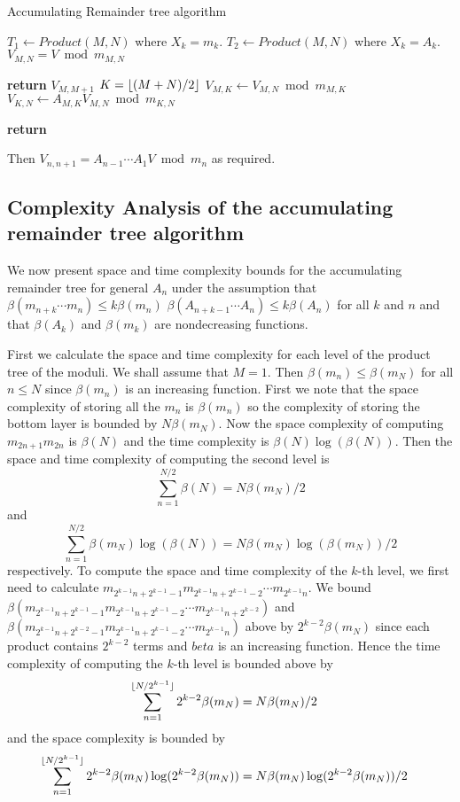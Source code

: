 \begin{algorithm}[H]
\caption{Accumulating Remainder tree algorithm}\label{accremainder}
\begin{algorithmic}

\State $T_{1}\gets Product(M,N)$ where $X_k=m_k$.
\State $T_{2}\gets Product(M,N)$ where $X_k=A_k$. 
\State $V_{M,N}=V \bmod m_{M,N}$ 
 
	\State 
	\State \textbf{return} $V_{M,M+1}$
\Else 
	\State $K=\lfloor(M+N)/2\rfloor$
	\State $V_{M,K} \gets V_{M,N}\bmod m_{M,K}$
	\State $V_{K,N} \gets A_{M,K}V_{M,N}\bmod m_{K,N}$
	
	\State \textbf{return} 

\EndIf
\EndProcedure
\end{algorithmic}
\end{algorithm}   

Then $V_{n,n+1}=A_{n-1}\cdots A_{1}V \bmod m_n$ as required. 

\subsection{Complexity Analysis of the accumulating remainder tree algorithm}

We now present space and time complexity bounds for the accumulating remainder tree for general $A_n$ under the assumption that $\beta(m_{n+k}\cdots m_{n})\leq k\beta(m_{n})$ $\beta(A_{n+k-1}\cdots A_{n})\leq k\beta(A_{n})$ for all $k$ and $n$ and that $\beta(A_k)$ and $\beta(m_k)$ are nondecreasing functions.

First we calculate the space and time complexity for each level of the product tree of the moduli.  We shall assume that $M=1$. Then $\beta(m_n)\leq \beta(m_N)$ for all $n\leq N$ since $\beta(m_n)$ is an increasing function. First we note that the space complexity of storing all the $m_n$ is $\beta(m_n)$ so the complexity of storing the bottom layer is bounded by $N\beta(m_N)$. Now the space complexity of computing $m_{2n+1} m_{2n}$ is $\beta(N)$ and the time complexity is $\beta(N)\log(\beta(N))$. Then the space and time complexity of computing the second level is \[\sum_{n=1}^{N/2} \beta(N)=N\beta(m_N)/2 \] and \[\sum_{n=1}^{N/2} \beta(m_N)\log(\beta(N))=N\beta(m_N)\log(\beta(m_N))/2 \] respectively. To compute the space and time complexity of the $k$-th level, we first need to calculate $m_{2^{k-1}n+2^{k-1}-1}m_{2^{k-1}n+2^{k-1}-2}\cdots m_{2^{k-1}n}$. We bound $\beta(m_{2^{k-1}n+2^{k-1}-1}m_{2^{k-1}n+2^{k-1}-2}\cdots m_{2^{k-1}n+2^{k-2}})$ and $\beta(m_{2^{k-1}n+2^{k-2}-1}m_{2^{k-1}n+2^{k-1}-2}\cdots m_{2^{k-1}n})$ above by $2^{k-2}\beta(m_N)$ since each product contains $2^{k-2}$ terms and $beta$ is an increasing function. Hence the time complexity of computing the $k$-th level is bounded above by 
\begin{align*}\sum_{n=1}^{\lfloor N/2^{k-1}\rfloor} 2^{k-2}\beta(m_N)&=N\beta(m_N)/2
\end{align*}
and the space complexity is bounded by   \begin{align*}\sum_{n=1}^{\lfloor N/2^{k-1}\rfloor} 2^{k-2}\beta(m_N)\log(2^{k-2}\beta(m_N))&=N\beta(m_N)\log(2^{k-2}\beta(m_N))/2
\end{align*} 

